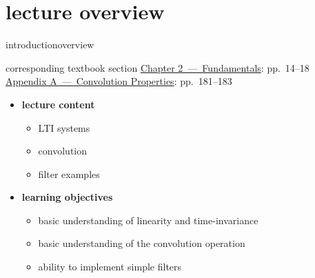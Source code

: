 




\subtitle{Module 2.3: Fundamentals~---~Convolution}


	

    \section[overview]{lecture overview}
        \begin{frame}{introduction}{overview}
            \begin{block}{corresponding textbook section}
                    \href{http://ieeexplore.ieee.org/xpl/articleDetails.jsp?tp=&arnumber=6331119&}{Chapter 2~---~Fundamentals}: pp.~14--18\\
                    \href{http://ieeexplore.ieee.org/xpl/articleDetails.jsp?arnumber=6331114}{Appendix A~---~Convolution Properties}: pp.~181--183
            \end{block}

            \begin{itemize}
                \item   \textbf{lecture content}
                    \begin{itemize}
                        \item   LTI systems
                        \item   convolution
                        \item   filter examples
                    \end{itemize}
                \bigskip
                \item<2->   \textbf{learning objectives}
                    \begin{itemize}
                        \item   basic understanding of linearity and time-invariance
                        \item   basic understanding of the convolution operation
                        \item   ability to implement simple filters
                    \end{itemize}
            \end{itemize}
        \end{frame}
        

